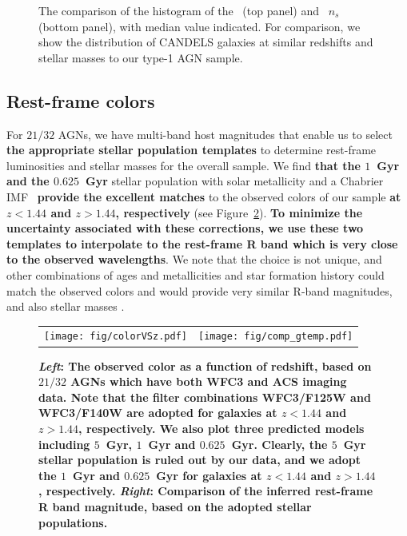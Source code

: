 \documentclass[apj]{emulateapj}
\begin{document}
\begin{figure}[ht]
\caption{\label{fig:hist_rn} 
The comparison of the histogram of the \Reff\ (top panel) and \sersic\ $n_s$ (bottom panel), with median value indicated. For comparison, we show the distribution of CANDELS galaxies at similar redshifts and stellar masses to our type-1 AGN sample.}
\end{figure} 

\subsection{Rest-frame colors}

For $21/32$ AGNs, we have multi-band host magnitudes that enable us to select {\bf the appropriate stellar population templates} to determine rest-frame luminosities and stellar masses for the overall sample.  We find {\bf that the $1$~Gyr and the $0.625$~Gyr} stellar population with solar metallicity and a Chabrier IMF~\citep{Bruzual2003} {\bf provide the excellent matches} to the observed colors of our sample {\bf at $z<1.44$ and $z>1.44$, respectively}  (see Figure~\ref{fig:compare_temp}). {\bf To minimize the uncertainty associated with these corrections, we use these two templates to interpolate to the rest-frame R band which is very close to the observed wavelengths}. We note that the choice is not unique, and other combinations of ages and metallicities and star formation history could match the observed colors and would provide very similar R-band magnitudes, and also stellar masses \citep{Bell2000, Bell2001}. 

\begin{figure}
\centering
\begin{tabular}{c c}
{\texttt{[image: fig/colorVSz.pdf]}}&
{\texttt{[image: fig/comp\_gtemp.pdf]}}\\
\end{tabular}
\caption{\label{fig:compare_temp} 
{\bf {\it Left}: The observed color as a function of redshift, based on $21/32$ AGNs which have both WFC3 and ACS imaging data. Note that the filter  combinations WFC3/F125W and WFC3/F140W are adopted for galaxies at $z<1.44$ and $z>1.44$, respectively. 
We also plot three predicted models including $5$~Gyr, $1$~Gyr and $0.625$~Gyr. Clearly, the $5$~Gyr stellar population is ruled out by our data, and we adopt the $1$~Gyr and $0.625$~Gyr for galaxies at $z<1.44$ and $z>1.44$, respectively.
 {\it Right}: Comparison of the inferred rest-frame R band magnitude, based on the adopted stellar populations.
 }
}
\end{figure} 
\end{document}

